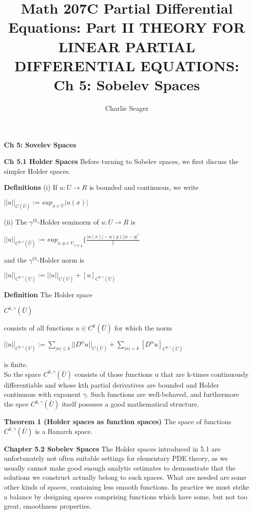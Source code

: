 \documentclass{article}
\begin{document}
\title {Math 207C Partial Differential Equations: Part II THEORY FOR LINEAR PARTIAL DIFFERENTIAL EQUATIONS: Ch 5: Sobelev Spaces}

\author{Charlie Seager}

\maketitle

\textbf {Ch 5: Sovelev Spaces}

\textbf{Ch 5.1 Holder Spaces} Before turning to Sobelev spaces, we first discuss the simpler Holder spaces.

\textbf {Definitions} (i) If $u: U \to R$ is bounded and continuous, we write
\begin{center}
$||u||_{C(\bar{U})} := sup_{x \in U} |u(x)|$
\end{center}
(ii) The $\gamma^{th}$-Holder seminorm of $u: U \to R$ is 
\begin{center}
$||u||_{C^{0,\gamma} (\hat{U})}:= sup_{{x, y \in U}_{x \neq y}} \{ \frac{{|u(x)| - u(y)|}{|x-y|^{\gamma}}} \}$
\end{center}
and the $\gamma^{th}$-Holder norm is
\begin{center}
$||u||_{C^{0,\gamma}(\bar{U})} := ||u||_{C(\bar{U})} + [u]_{C^{0, \gamma}(\bar{U})}$
\end{center}

\textbf {Definition} The Holder space
\begin{center}
$C^{k, \gamma}(\bar{U})$
\end{center}
consists of all functions $u \in C^{k}(\bar{U})$ for which the norm
\begin{center}
$||u||_{C^{k, \gamma}(\bar{U})} := \sum_{|\alpha| \leq k} ||D^{\alpha}u||_{C(\bar{U})} + \sum_{|\alpha| = k} [D^{\alpha}u]_{C^{0, \gamma}(\bar{U})}$
\end{center}
is finite. \\
So the space $C^{k, \gamma}(\bar{U})$ consists of those functions u that are k-times continuously differentiable and whose kth partial derivatives are bounded and Holder continuous with exponent $\gamma$. Such functions are well-behaved, and furthermore the spce $C^{k, \gamma} (\bar{U})$ itself posesses a good mathematical structure.

\textbf {Theorem 1 (Holder spaces as function spaces)} The space of functions $C^{k, \gamma}(\bar{U})$ is a Banarch space.

\textbf {Chapter 5.2 Sobelev Spaces} The Holder spaces introduced in 5.1 are unfortunately not often suitable settings for elementary PDE theory, as we usually cannot make good enough analytic estimates to demonstrate that the solutions we construct actually belong to such spaces. What are needed are some other kinds of spaces, containing less smooth functions. In practice we must strike a balance by designing spaces comprising functions which have some, but not too great, smoothness properties.
\end{document}
